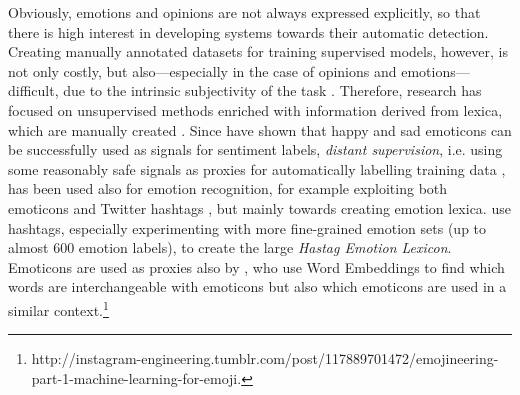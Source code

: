 \documentclass[11pt]{article}
\begin{document}
Obviously, emotions and opinions are not always expressed explicitly, so that there is high interest in developing systems towards their automatic detection. Creating manually annotated datasets for training supervised models, however, is not only costly, but also---especially in the case of opinions and emotions---difficult, due to the intrinsic subjectivity of the task \cite{strapparava2008learning,kim2010evaluation}. Therefore, research has focused on unsupervised methods enriched with information derived from lexica, which are manually created \cite{chaffar2011using,kim2010evaluation}. Since  have shown that happy and sad emoticons can be successfully used as signals for sentiment labels, \textit{distant supervision}, i.e.  using some reasonably safe signals as proxies for automatically labelling training data \cite{mintz:2009}, has been used also for emotion recognition, for example exploiting both emoticons and Twitter hashtags \cite{purver2012experimenting}, but mainly towards creating emotion lexica.  use hashtags, especially experimenting with more fine-grained emotion sets (up to almost 600 emotion labels), to create the large \textit{Hastag Emotion Lexicon}. Emoticons are used as proxies also by , who use Word Embeddings to find which words are interchangeable with emoticons but also which emoticons are used in a similar context.\footnote{{http://instagram-engineering.tumblr.com/post/117889701472/emojineering-part-1-machine-learning-for-emoji}.}


%
%
%
%
\end{document}
